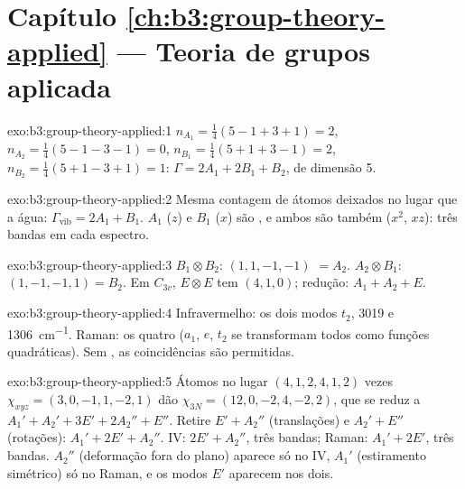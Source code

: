\section*{Capítulo \ref{ch:b3:group-theory-applied} --- Teoria de grupos aplicada}

\begin{solution}{exo:b3:group-theory-applied:1}
$n_{A_1} = \frac14(5 - 1 + 3 + 1) = 2$, $n_{A_2} = \frac14(5 - 1 - 3 - 1) = 0$,
$n_{B_1} = \frac14(5 + 1 + 3 - 1) = 2$, $n_{B_2} = \frac14(5 + 1 - 3 + 1) = 1$:
$\Gamma = 2A_1 + 2B_1 + B_2$, de dimensão 5.
\end{solution}

\begin{solution}{exo:b3:group-theory-applied:2}
Mesma contagem de átomos deixados no lugar que a água: $\Gamma_{\mathrm{vib}} = 2A_1 + B_1$. $A_1$ ($z$) e
$B_1$ ($x$) são , e ambos são também  ($x^2$, $xz$): três
bandas em cada espectro.
\end{solution}

\begin{solution}{exo:b3:group-theory-applied:3}
$B_1\otimes B_2$:  $(1, 1, -1, -1)$ $= A_2$. $A_2\otimes B_1$: $(1, -1, -1,
1) = B_2$. Em $C_{3v}$, $E\otimes E$ tem  $(4, 1, 0)$; redução: $A_1 + A_2 +
E$.
\end{solution}

\begin{solution}{exo:b3:group-theory-applied:4}
Infravermelho: os dois modos $t_2$, 3019 e \qty{1306}{cm^{-1}}. Raman: os quatro ($a_1$,
$e$, $t_2$ se transformam todos como funções quadráticas). Sem ,
as coincidências são permitidas.
\end{solution}

\begin{solution}{exo:b3:group-theory-applied:5}
Átomos no lugar $(4, 1, 2, 4, 1, 2)$ vezes $\chi_{xyz} = (3, 0, -1, 1, -2, 1)$ dão
$\chi_{3N} = (12, 0, -2, 4, -2, 2)$, que se reduz a $A_1' + A_2' + 3E' + 2A_2'' +
E''$. Retire $E' + A_2''$ (translações) e $A_2' + E''$ (rotações): $A_1' + 2E'
+ A_2''$. IV: $2E' + A_2''$, três bandas; Raman: $A_1' + 2E'$, três bandas. $A_2''$
(deformação fora do plano) aparece só no IV, $A_1'$ (estiramento simétrico) só no
Raman, e os modos $E'$ aparecem nos dois.
\end{solution}

